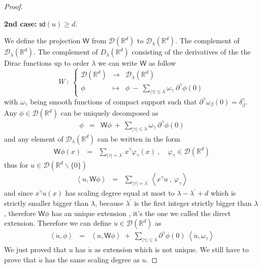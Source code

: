 \documentclass[10pt]{book}
\newcommand{\sd}{\mathsf{sd}}
\newcommand{\abs}[1]{\left|#1\right|}
\newcommand{\sm}[1]{\left\langle#1\right\rangle}
\newcommand{\Dcal}{\mathcal{D}}
\newcommand{\Rbb}{\mathbb{R}}
\newcommand{\Wsf}{\mathsf{W}}
\theoremstyle{break}
\begin{document}
\begin{proof}
 \begin{center}
  \textbf{2nd case:} $\sd(u)\geq d$. 
 \end{center}
 We define the projection $\Wsf$ from $\Dcal(\Rbb^d)$ to $\Dcal_\lambda(\Rbb^d)$. The complement of $\Dcal_\lambda(\Rbb^d)$. The complement of $D_\lambda(\Rbb^d)$ consisting of the derivatives of the the Dirac functions up to order $\lambda$ we can write $\Wsf$ as follow
 \begin{equation*}
  W \ : \ \left\{
  \begin{array}{ccl}
   \Dcal(\Rbb^d) & \to & \Dcal_\lambda(\Rbb^d) \\
   \phi & \mapsto & \phi \ - \ \underset{\abs{\gamma}\leq\lambda}{\sum} \omega_\gamma \ \partial^\gamma \phi(0)
  \end{array}
  \right.
 \end{equation*}
 with $\omega_\gamma$ being smooth functions of compact support such that $\partial^\gamma\omega_\beta(0)=\delta^\gamma_\beta$. Any $\phi \in \Dcal(\Rbb^d)$ can be uniquely decomposed as 
 \begin{eqnarray*}
  \phi &=& \Wsf \phi \ + \ \sum_{\abs{\gamma}\leq\lambda} \omega_\gamma \ \partial^\gamma \phi(0)
 \end{eqnarray*}
 and any element of $\Dcal_\lambda(\Rbb^d)$ can be written in the form
 \begin{eqnarray*}
  \Wsf \phi(x) &=& \sum_{\abs{\gamma}=\lambda^\prime} x^\gamma \varphi_\gamma(x) \ , \quad \varphi_\gamma \in \Dcal(\Rbb^d)
 \end{eqnarray*}
 thus for $u \in \Dcal(\Rbb^d \backslash \{0\})$ 
 \begin{eqnarray*}
  \sm{u,\Wsf\phi} &=& \sum_{\abs{\gamma}=\lambda^\prime} \sm{x^\gamma u \ , \ \varphi_\gamma}
 \end{eqnarray*}
 and since $x^\gamma u(x)$ has scaling degree equal at most to $\lambda - \lambda^\prime + d$ which is strictly smaller bigger than $\lambda$, because $\lambda^\prime$ is the first integer strictly bigger than $\lambda$, therefore $\Wsf \phi$ has an unique extension , it's the one we called the direct extension. Therefore we can define $\dot{u} \in \Dcal(\Rbb^d)$ as
 \begin{eqnarray*}
  \sm{\dot{u},\phi} &=& \sm{u,\Wsf\phi} \ + \ \sum_{\abs{\gamma}\leq\lambda} \partial^\gamma \phi(0) \ \sm{\dot{u},\omega_\gamma} 
 \end{eqnarray*}
 We just proved that $u$ has $\dot{u}$ as extension which is not unique. We still have to prove that $\dot{u}$ has the same scaling degree as $u$.
 

\end{proof}
\end{document}
